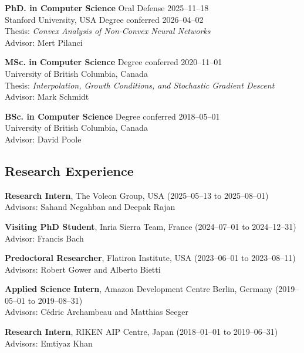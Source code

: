 \documentclass[11pt, a4paper]{article}
\makeatletter
\gdef\tshortstack{\@ifnextchar[\@tshortstack{\@tshortstack[c]}}
\gdef\@tshortstack[#1]{%
  \leavevmode
  \vtop\bgroup
    \baselineskip-\p@\lineskip 3\p@
    \let\mb@l\hss\let\mb@r\hss
    \expandafter\let\csname mb@#1\endcsname\relax
    \let\\\@stackcr
    \@ishortstack}
\newcommand{\mitem}[1]{\item[\smash{\tshortstack[l]{#1}}]}
\newcommand{\mleftsize}{4.75em}
\makeatother
\begin{document}
\begin{description}[leftmargin=\mleftsize,style=nextline,font=\normalfont\space]
    \mitem{2026}
    \textbf{PhD. in Computer Science} \hfill Oral Defense 2025--11--18\\
    Stanford University, USA \hfill Degree conferred 2026--04--02\\
    Thesis: \emph{Convex Analysis of Non-Convex Neural Networks}\\
    Advisor: Mert Pilanci

    \mitem{2020}
    \textbf{MSc. in Computer Science} \hfill Degree conferred 2020--11--01\\
    University of British Columbia, Canada	\\
    Thesis: \emph{Interpolation, Growth Conditions, and Stochastic Gradient Descent} \\
    Advisor: Mark Schmidt

    \mitem{2018}
    \textbf{BSc. in Computer Science} \hfill Degree conferred 2018--05--01\\
    University of British Columbia, Canada \\
    Advisor: David Poole
\end{description}

\subsection{Research Experience}
\begin{description}[leftmargin=\mleftsize,style=nextline,font=\normalfont\space]
    \item[2025]
          \textbf{Research Intern}, The Voleon Group, USA  \hfill (2025--05--13 to 2025--08--01)
          \\
          Advisors: Sahand Negahban and Deepak Rajan
    \item[2024]
          \textbf{Visiting PhD Student}, Inria Sierra Team, France \hfill (2024--07--01 to 2024--12--31)
          \\
          Advisor: Francis Bach
    \item[2023]
          \textbf{Predoctoral Researcher}, Flatiron Institute, USA \hfill (2023--06--01 to 2023--08--11)
          \\
          Advisors: Robert Gower and Alberto Bietti
    \item[2019]
          \textbf{Applied Science Intern}, Amazon Development Centre Berlin, Germany \hfill (2019--05--01 to 2019--08--31)
          \\
          Advisors: Cédric Archambeau and Matthias Seeger
    \item[2018]
          \textbf{Research Intern}, RIKEN AIP Centre, Japan \hfill (2018--01--01 to 2019--06--31)
          \\
          Advisors: Emtiyaz Khan
\end{description}
\end{document}
